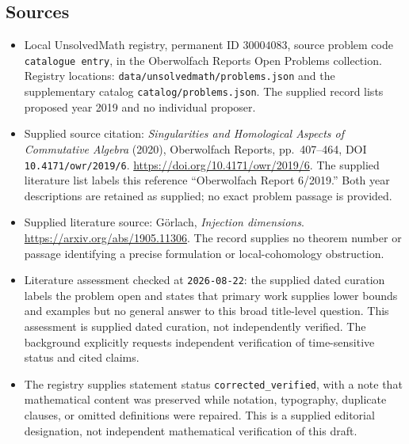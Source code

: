 \documentclass[11pt]{article}
\begin{document}
\subsection{Sources}
\begin{itemize}
\item Local UnsolvedMath registry, permanent ID \(30004083\), source problem code \texttt{catalogue entry}, in the Oberwolfach Reports Open Problems collection. Registry locations: \texttt{data/unsolvedmath/problems.json} and the supplementary catalog \texttt{catalog/problems.json}. The supplied record lists proposed year 2019 and no individual proposer.
\item Supplied source citation: \emph{Singularities and Homological Aspects of Commutative Algebra} (2020), Oberwolfach Reports, pp.\ 407--464, DOI \texttt{10.4171/owr/2019/6}. \url{https://doi.org/10.4171/owr/2019/6}. The supplied literature list labels this reference ``Oberwolfach Report 6/2019.'' Both year descriptions are retained as supplied; no exact problem passage is provided.
\item Supplied literature source: G\"orlach, \emph{Injection dimensions}. \url{https://arxiv.org/abs/1905.11306}. The record supplies no theorem number or passage identifying a precise formulation or local-cohomology obstruction.
\item Literature assessment checked at \texttt{2026-08-22}: the supplied dated curation labels the problem open and states that primary work supplies lower bounds and examples but no general answer to this broad title-level question. This assessment is supplied dated curation, not independently verified. The background explicitly requests independent verification of time-sensitive status and cited claims.
\item The registry supplies statement status \texttt{corrected\_verified}, with a note that mathematical content was preserved while notation, typography, duplicate clauses, or omitted definitions were repaired. This is a supplied editorial designation, not independent mathematical verification of this draft.
\end{itemize}
\end{document}
